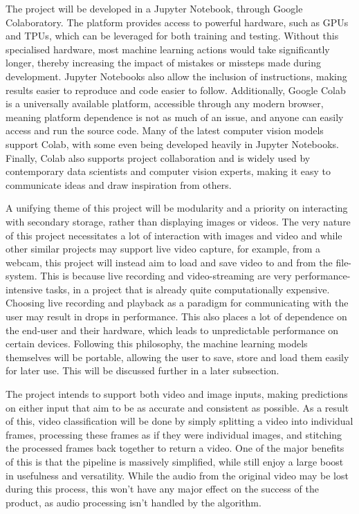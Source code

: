 \documentclass[a4paper, oneside, 11pt]{article}
\begin{document}
\bigskip
\noindent
The project will be developed in a Jupyter Notebook, through Google Colaboratory. The platform provides access to powerful hardware, such as GPUs and TPUs, which can be leveraged for both training and testing. Without this specialised hardware, most machine learning actions would take significantly longer, thereby increasing the impact of mistakes or missteps made during development. Jupyter Notebooks also allow the inclusion of instructions, making results easier to reproduce and code easier to follow. Additionally, Google Colab is a universally available platform, accessible through any modern browser, meaning platform dependence is not as much of an issue, and anyone can easily access and run the source code. Many of the latest computer vision models support Colab, with some even being developed heavily in Jupyter Notebooks. Finally, Colab also supports project collaboration and is widely used by contemporary data scientists and computer vision experts, making it easy to communicate ideas and draw inspiration from others.

\bigskip
\noindent
A unifying theme of this project will be modularity and a priority on interacting with secondary storage, rather than displaying images or videos. The very nature of this project necessitates a lot of interaction with images and video and while other similar projects may support live video capture, for example, from a webcam, this project will instead aim to load and save video to and from the file-system. This is because live recording and video-streaming are very performance-intensive tasks, in a project that is already quite computationally expensive. Choosing live recording and playback as a paradigm for communicating with the user may result in drops in performance. This also places a lot of dependence on the end-user and their hardware, which leads to unpredictable performance on certain devices. Following this philosophy, the machine learning models themselves will be portable, allowing the user to save, store and load them easily for later use. This will be discussed further in a later subsection.

\bigskip
\noindent
The project intends to support both video and image inputs, making predictions on either input that aim to be as accurate and consistent as possible. As a result of this, video classification will be done by simply splitting a video into individual frames, processing these frames as if they were individual images, and stitching the processed frames back together to return a video. One of the major benefits of this is that the pipeline is massively simplified, while still enjoy a large boost in usefulness and versatility. While the audio from the original video may be lost during this process, this won't have any major effect on the success of the product, as audio processing isn't handled by the algorithm.
\end{document}
